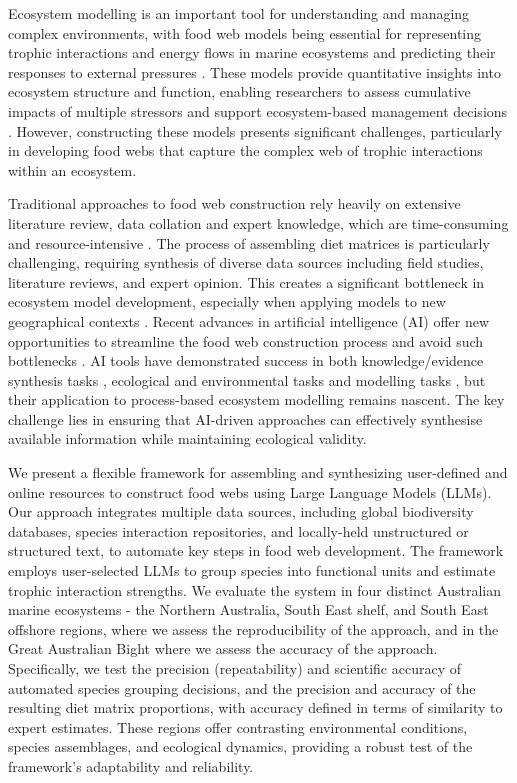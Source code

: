 Ecosystem modelling is an important tool for understanding and managing complex environments, with food web models being essential for representing trophic interactions and energy flows in marine ecosystems and predicting their responses to external pressures \citep{Christensen2004, Colleter2015,audzijonyte2019atlantis}. These models provide quantitative insights into ecosystem structure and function, enabling researchers to assess cumulative impacts of multiple stressors and support ecosystem-based management decisions \citep{Coll2015, Villasante2016,Geary2020}. However, constructing these models presents significant challenges, particularly in developing food webs that capture the complex web of trophic interactions within an ecosystem.

Traditional approaches to food web construction rely heavily on extensive literature review, data collation and expert knowledge, which are time-consuming and resource-intensive \citep{Holden2024a}. The process of assembling diet matrices is particularly challenging, requiring synthesis of diverse data sources including field studies, literature reviews, and expert opinion. This creates a significant bottleneck in ecosystem model development, especially when applying models to new geographical contexts \citep{Holden2024b}. Recent advances in artificial intelligence (AI) offer new opportunities to streamline the food web construction process and avoid such bottlenecks \citep{spilliasfuture}. AI tools have demonstrated success in both knowledge/evidence synthesis tasks \citep{spillias2024human,keck2025extracting,castro2024large,spillias2024evaluating,Zheng2023,nugraha2024traditional}, ecological and environmental tasks \citep{Fernandes2024,Li2024,Chen2024,dorm2025large,Noleto2024} and modelling tasks \citep{Lapeyrolerie2022, Tuia2022, Karniadakis2021}, but their application to process-based ecosystem modelling remains nascent. The key challenge lies in ensuring that AI-driven approaches can effectively synthesise available information while maintaining ecological validity.

We present a flexible framework for assembling and synthesizing user-defined and online resources to construct food webs using Large Language Models (LLMs). Our approach integrates multiple data sources, including global biodiversity databases, species interaction repositories, and locally-held unstructured or structured text, to automate key steps in food web development. The framework employs user-selected LLMs to group species into functional units and estimate trophic interaction strengths. We evaluate the system in four distinct Australian marine ecosystems - the Northern Australia, South East shelf, and South East offshore regions, where we assess the reproducibility of the approach, and in the Great Australian Bight where we assess the accuracy of the approach. Specifically, we test the precision (repeatability) and scientific accuracy of automated species grouping decisions, and the precision and accuracy of the resulting diet matrix proportions, with accuracy defined in terms of similarity to expert estimates. These regions offer contrasting environmental conditions, species assemblages, and ecological dynamics, providing a robust test of the framework's adaptability and reliability.

